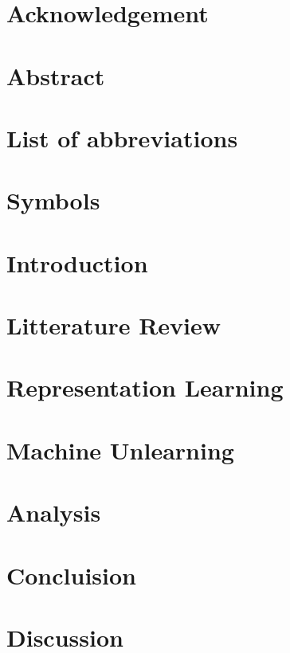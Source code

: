 \documentclass[12pt]{report}
\begin{document}



\chapter*{Acknowledgement}


\chapter*{Abstract}




\listoffigures


\chapter*{List of abbreviations}



\chapter*{Symbols}


\tableofcontents

\chapter{Introduction}




\chapter{Litterature Review}



\chapter{Representation Learning}




\chapter{Machine Unlearning}


\chapter{Analysis}

\chapter{Concluision}

\chapter{Discussion}

\printbibliography
\end{document}

